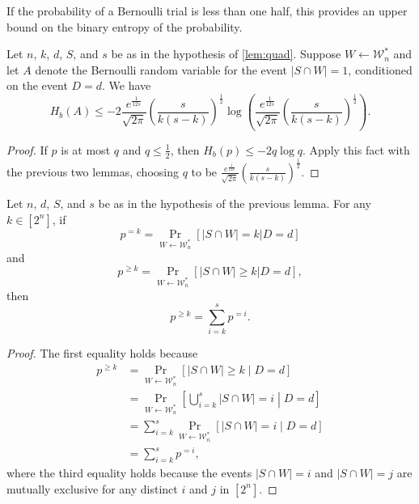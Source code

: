 \documentclass{article}
\newcommand{\mc}{\mathcal}
\begin{document}
If the probability of a Bernoulli trial is less than one half, this provides an upper bound on the binary entropy of the probability.

\begin{lemma}
  Let $n$, $k$, $d$, $S$, and $s$ be as in the hypothesis of \autoref{lem:quad}.
  Suppose $W \gets \mc{W}^*_n$ and let $A$ denote the Bernoulli random variable for the event $|S \cap W| = 1$, conditioned on the event $D = d$.
  We have
  \begin{equation*}
    H_b(A) \leq -2 \frac{e^{\frac{1}{12s}}}{\sqrt{2 \pi}} \left(\frac{s}{k (s - k)}\right)^{\frac{1}{2}} \log \left(\frac{e^{\frac{1}{12s}}}{\sqrt{2 \pi}} \left(\frac{s}{k (s - k)}\right)^{\frac{1}{2}}\right).
  \end{equation*}
\end{lemma}
\begin{proof}
  If $p$ is at most $q$ and $q \leq \frac{1}{2}$, then $H_b(p) \leq -2 q \log q$.
  Apply this fact with the previous two lemmas, choosing $q$ to be $\frac{e^{\frac{1}{12s}}}{\sqrt{2 \pi}} \left(\frac{s}{k (s - k)}\right)^{\frac{1}{2}}$.
\end{proof}

\begin{lemma}
  Let $n$, $d$, $S$, and $s$ be as in the hypothesis of the previous lemma.
  For any $k \in [2^n]$, if
  \begin{equation*}
    p^{= k} = \Pr_{W \gets \mc{W}_n^*}[ |S \cap W| = k | D = d]
  \end{equation*}
  and
  \begin{equation*}
    p^{\geq k} = \Pr_{W \gets \mc{W}_n^*}[ |S \cap W| \geq k | D = d],
  \end{equation*}
  then
  \begin{equation*}
    p^{\geq k} = \sum_{i = k}^{s} p^{= i}.
  \end{equation*}
\end{lemma}
\begin{proof}
  The first equality holds because
  \begin{align*}
    p^{\geq k} & = \Pr_{W \gets \mc{W}_n^*}\left[ |S \cap W| \geq k \middle| D = d \right] \\
    & = \Pr_{W \gets \mc{W}_n^*}\left[ \bigcup_{i = k}^{s} |S \cap W| = i \middle| D = d \right] \\
    & = \sum_{i = k}^{s} \Pr_{W \gets \mc{W}_n^*}\left[ |S \cap W| = i \middle| D = d\right] \\
    & = \sum_{i = k}^{s} p^{= i},
  \end{align*}
  where the third equality holds because the events $|S \cap W| = i$ and $|S \cap W| = j$ are mutually exclusive for any distinct $i$ and $j$ in $[2^n]$.
\end{proof}
\end{document}

